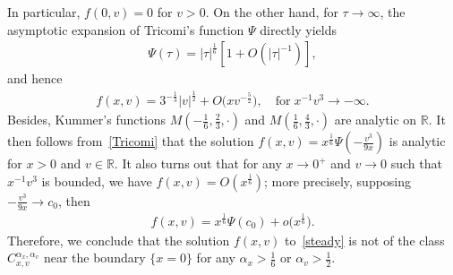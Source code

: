 \documentclass[10pt]{amsart}
\theoremstyle{definition}\newtheorem{defi}[theo]{Definition}\newtheorem{rema}[theo]{Remark}\newtheorem{exam}[theo]{Example}\newtheorem{exem}[theo]{Example}\newtheorem{nota}[theo]{Notation}
\newcommand*\R {\mathbb{R}}
\begin{document}
In particular, $f(0,v)=0$ for $v>0$. On the other hand, for $\tau\rightarrow\infty$, the asymptotic expansion of Tricomi's function $\Psi$ directly yields
\begin{align*}
\Psi(\tau)=|\tau|^\frac{1}{6}\left[1+O\!\left(|\tau|^{-1}\right)\right],
\end{align*}
and hence
\begin{align*}
f(x,v)= 3^{-\frac{1}{3}}|v|^\frac{1}{2} +O\big(xv^{-\frac{5}{2}}\big),\quad\text{for}\; x^{-1}{v^3}\rightarrow-\infty.
\end{align*}
Besides, Kummer's functions $M(-\frac{1}{6},\frac{2}{3},\cdot)$ and $M(\frac{1}{6},\frac{4}{3},\cdot)$ are analytic on $\R$. It then follows from~\eqref{Tricomi} that the solution $f(x,v)=x^\frac{1}{6}\Psi(-\frac{v^3}{9x})$ is analytic for $x>0$ and $v\in\R$. It also turns out that for any $x\rightarrow0^+$ and $v\rightarrow0$ such that $x^{-1}{v^3}$ is bounded, we have $f(x,v)=O(x^\frac{1}{6})$; more precisely, supposing $-\frac{v^3}{9x}\rightarrow c_0$, then
\begin{align*}
f(x,v)= x^\frac{1}{6}\Psi(c_0)+o\big(x^\frac{1}{6}\big).
\end{align*}
Therefore, we conclude that the solution $f(x,v)$ to~\eqref{steady} is not of the class $C^{\alpha_x,\alpha_v}_{x,v}$ near the boundary $\{x=0\}$ for any $\alpha_x>\frac{1}{6}$ or $\alpha_v>\frac{1}{2}$.
\end{document}

